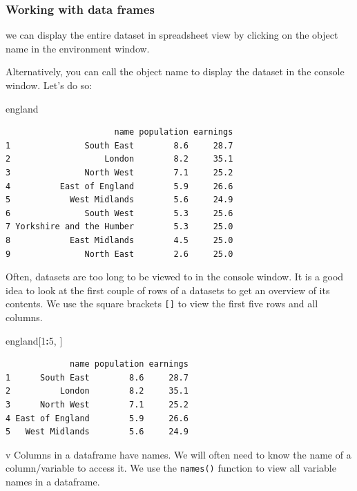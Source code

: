\documentclass[]{article}
\newenvironment{Shaded}{\begin{snugshade}}{\end{snugshade}}
\newcommand{\DecValTok}[1]{\textcolor[rgb]{0.00,0.00,0.81}{#1}}
\newcommand{\NormalTok}[1]{#1}
\newcommand{\OperatorTok}[1]{\textcolor[rgb]{0.81,0.36,0.00}{\textbf{#1}}}
\begin{document}
\hypertarget{working-with-data-frames}{%
\subsubsection{Working with data frames}\label{working-with-data-frames}}

we can display the entire dataset in spreadsheet view by clicking on the object name in the environment window.

Alternatively, you can call the object name to display the dataset in the console window. Let's do so:

\begin{Shaded}
\begin{Highlighting}[]
\NormalTok{england}
\end{Highlighting}
\end{Shaded}

\begin{verbatim}
                      name population earnings
1               South East        8.6     28.7
2                   London        8.2     35.1
3               North West        7.1     25.2
4          East of England        5.9     26.6
5            West Midlands        5.6     24.9
6               South West        5.3     25.6
7 Yorkshire and the Humber        5.3     25.0
8            East Midlands        4.5     25.0
9               North East        2.6     25.0
\end{verbatim}

Often, datasets are too long to be viewed to in the console window. It is a good idea to look at the first couple of rows of a datasets to get an overview of its contents. We use the square brackets \texttt{{[}{]}} to view the first five rows and all columns.

\begin{Shaded}
\begin{Highlighting}[]
\NormalTok{england[}\DecValTok{1}\OperatorTok{:}\DecValTok{5}\NormalTok{, ]}
\end{Highlighting}
\end{Shaded}

\begin{verbatim}
             name population earnings
1      South East        8.6     28.7
2          London        8.2     35.1
3      North West        7.1     25.2
4 East of England        5.9     26.6
5   West Midlands        5.6     24.9
\end{verbatim}

v
Columns in a dataframe have names. We will often need to know the name of a column/variable to access it. We use the \texttt{names()} function to view all variable names in a dataframe.
\end{document}
